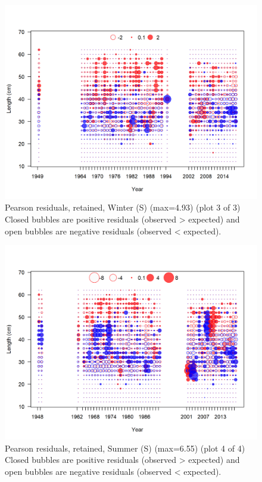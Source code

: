 \documentclass[12pt,]{article}
\begin{document}
\begin{figure}
\centering
\includegraphics{r4ss/plots_mod1/comp_lenfit_residsflt3mkt2_page3.png}
\caption{Pearson residuals, retained, Winter (S) (max=4.93) (plot 3 of
3)\\
Closed bubbles are positive residuals (observed \textgreater{} expected)
and open bubbles are negative residuals (observed \textless{} expected).
\label{fig:ws_len_pearson}}
\end{figure}

\begin{figure}
\centering
\includegraphics{r4ss/plots_mod1/comp_lenfit_residsflt4mkt2_page4.png}
\caption{Pearson residuals, retained, Summer (S) (max=6.55) (plot 4 of
4)\\
Closed bubbles are positive residuals (observed \textgreater{} expected)
and open bubbles are negative residuals (observed \textless{} expected).
\label{fig:ss_len_pearson}}
\end{figure}
\end{document}
